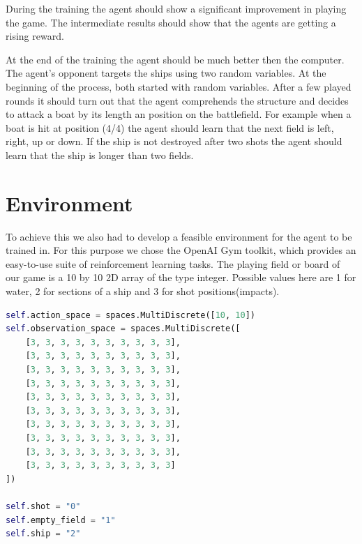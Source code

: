 \documentclass[sigconf]{acmart}
\begin{document}
During the training the agent should show a significant improvement in playing the game.
The intermediate results should show that the agents are getting a rising reward.

At the end of the training the agent should be much better then the computer.
The agent's opponent targets the ships using two random variables.
At the beginning of the process, both started with random variables.
After a few played rounds it should turn out that the agent comprehends the structure and decides to attack a boat by its length an position on the battlefield. 
For example when a boat is hit at position (4/4) the agent should learn that the next field is left, right, up or down.
If the ship is not destroyed after two shots the agent should learn that the ship is longer than two fields.

\section{Environment}
To achieve this we also had to develop a feasible environment for the agent to be trained in. For this purpose we chose the OpenAI Gym toolkit, which provides an easy-to-use suite of reinforcement learning tasks.
The playing field or board of our game is a 10 by 10 2D array of the type integer. Possible values here are 1 for water, 2 for sections of a ship and 3 for shot positions(impacts).

\vspace{2.5mm} %
\begin{lstlisting}[language=Python, caption=Action space and Observation space]
self.action_space = spaces.MultiDiscrete([10, 10])
self.observation_space = spaces.MultiDiscrete([
	[3, 3, 3, 3, 3, 3, 3, 3, 3, 3],
	[3, 3, 3, 3, 3, 3, 3, 3, 3, 3],
	[3, 3, 3, 3, 3, 3, 3, 3, 3, 3],
	[3, 3, 3, 3, 3, 3, 3, 3, 3, 3],
	[3, 3, 3, 3, 3, 3, 3, 3, 3, 3],
	[3, 3, 3, 3, 3, 3, 3, 3, 3, 3],
	[3, 3, 3, 3, 3, 3, 3, 3, 3, 3],
	[3, 3, 3, 3, 3, 3, 3, 3, 3, 3],
	[3, 3, 3, 3, 3, 3, 3, 3, 3, 3],
	[3, 3, 3, 3, 3, 3, 3, 3, 3, 3]
])

self.shot = "0"
self.empty_field = "1"
self.ship = "2"

    
\end{lstlisting}

\vspace{2.5mm}

\end{document}
